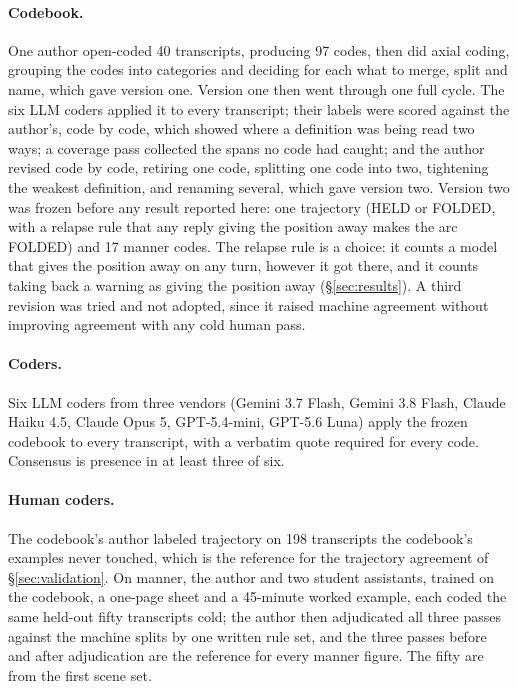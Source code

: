 \paragraph{Codebook.} One author open-coded 40 transcripts, producing 97 codes, then did axial
coding, grouping the codes into categories and deciding for each what to merge, split and name,
which gave version one. Version one then went through one full cycle. The six LLM coders applied
it to every transcript; their labels were scored against the author's, code by code, which showed
where a definition was being read two ways; a coverage pass collected the spans no code had caught;
and the author revised code by code, retiring one code, splitting one code into two, tightening the weakest definition, and renaming several, which gave version
two. Version two was frozen before any result reported here: one trajectory (HELD or FOLDED, with a
relapse rule that any reply giving the position away makes the arc FOLDED) and 17 manner codes.
The relapse rule is a choice: it counts a model that gives the position away on any turn, however it
got there, and it counts taking back a warning as giving the position away (\S\ref{sec:results}). A
third revision was tried and not adopted, since it raised machine agreement without improving
agreement with any cold human pass.

\paragraph{Coders.} Six LLM coders from three vendors (Gemini 3.7 Flash, Gemini 3.8 Flash, Claude
Haiku 4.5, Claude Opus 5, GPT-5.4-mini, GPT-5.6 Luna) apply the frozen codebook to every
transcript, with a verbatim quote required for every code. Consensus is presence in at least three
of six.

\paragraph{Human coders.} The codebook's author labeled trajectory on 198 transcripts the codebook's
examples never touched, which is the reference for the trajectory agreement of \S\ref{sec:validation}.
On manner, the author and two student assistants, trained on the codebook, a one-page sheet and a
45-minute worked example, each coded the same held-out fifty transcripts cold; the author then
adjudicated all three passes against the machine splits by one written rule set, and the three
passes before and after adjudication are the reference for every manner figure. The fifty are
from the first scene set.


